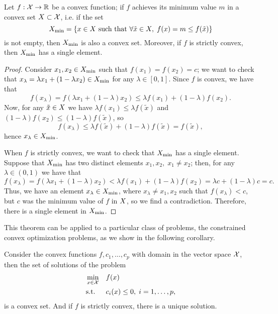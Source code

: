 \begin{theorem}
    Let $f: \mathcal{X} \to \mathbb{R}$ be a convex function; if $f$ achieves its minimum value $m$ in a convex set $X \subset \mathcal{X}$, i.e. if the set 
    $$ X_{\min} = \left\{x \in X \text{ such that }  \forall \tilde{x} \in X, \;  f(x) = m \leq f(\tilde{x})\right\}$$
    is not empty, then $X_{\min}$ is also a convex set. 
    Moreover, if $f$ is strictly convex, then $X_{\min}$ has a single element.
\end{theorem}
\begin{proof}
    Consider $x_1, x_2 \in X_{\min}$ such that $f(x_1) = f(x_2) = c$; we want to check that $x_\lambda = \lambda x_1 + (1 - \lambda x_2) \in X_{\min}$ for any $\lambda \in [0, 1]$.
    Since $f$ is convex, we have that
    \begin{equation}
        \nonumber
        f(x_\lambda) = f(\lambda x_1 + (1 - \lambda) x_2) \leq \lambda f(x_1) + (1 - \lambda) f(x_2) .
    \end{equation}
    Now, for any $\tilde{x} \in X$ we have $\lambda f(x_1) \leq \lambda f(\tilde{x})$ and $(1 - \lambda) f(x_2) \leq (1 - \lambda) f(\tilde{x})$, so 
    $$f(x_\lambda) \leq  \lambda f(\tilde{x}) + (1 - \lambda) f(\tilde{x}) = f(\tilde{x}),$$ hence $x_\lambda \in X_{\min}$.

    When $f$ is strictly convex, we want to check that $X_{\min}$ has a single element. Suppose that $X_{\min}$ has two distinct elements $x_1, x_2, \; x_1 \neq x_2$; then, for any $\lambda \in (0, 1)$ we have that 
    $$ f(x_\lambda) = f(\lambda x_1 + (1 - \lambda) x_2) < \lambda f(x_1) + (1 - \lambda) f(x_2) = \lambda c + (1- \lambda)c = c.$$
    Thus, we have an element $x_\lambda \in X_{\min}$, where $x_\lambda \neq x_1, x_2$ such that $f(x_\lambda) < c$, but $c$ was the minimum value of $f$ in $X$, so we find a contradiction. Therefore, there is a single element in $X_{\min}$.
\end{proof}
This theorem can be applied to a particular class of problems, the constrained convex optimization problems, as we show in the following corollary.
\begin{corollary}
    Consider the convex functions $f, c_1, \ldots, c_p$ with domain in the vector space $\mathcal{X}$, then the set of solutions of the problem
    \begin{equation}\nonumber
        \begin{aligned}
            &\min_{x \in \mathcal{X}} & & f(x) \\
            & \text{s.t.} & & c_i(x) \leq 0,\; i=1, \ldots, p ,  
        \end{aligned}
    \end{equation}
    is a convex set. And if $f$ is strictly convex, there is a unique solution.
\end{corollary}
